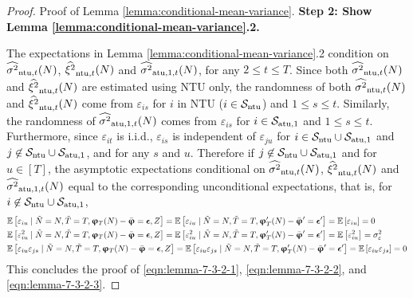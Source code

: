 \begin{proof}{Proof of Lemma \ref{lemma:conditional-mean-variance}.}
\textbf{Step 2: Show Lemma \ref{lemma:conditional-mean-variance}.2.}

The expectations in Lemma \ref{lemma:conditional-mean-variance}.2 condition on $\widehat{\sigma^2}_{\mathrm{ntu},t}(N)$, $\widehat{\xi^2}_{\mathrm{ntu},t}(N)$ and $\widehat{\sigma^2}_{\mathrm{atu},1,t}(N)$, for any $2 \leq t \leq T$. Since both $\widehat{\sigma^2}_{\mathrm{ntu},t}(N)$ and $\widehat{\xi^2}_{\mathrm{ntu},t}(N)$ are estimated using NTU only, the randomness of both $\widehat{\sigma^2}_{\mathrm{ntu},t}(N)$ and $\widehat{\xi^2}_{\mathrm{ntu},t}(N)$ come from $\varepsilon_{is}$ for $i $ in NTU ($i \in \mathcal{S}_{\mathrm{ntu}}$) and $1 \leq s\leq t$. Similarly, the randomness of $\widehat{\sigma^2}_{\mathrm{atu},1,t}(N)$ comes from $\varepsilon_{is}$ for $i \in \mathcal{S}_{\mathrm{atu},1}$ and $1 \leq s\leq t$.  Furthermore, since $\varepsilon_{it}$ is i.i.d.,  $\varepsilon_{is}$ is independent of $\varepsilon_{ju}$ for $i \in \mathcal{S}_{\mathrm{ntu}} \cup \mathcal{S}_{\mathrm{atu},1}$ and $j \not \in \mathcal{S}_{\mathrm{ntu}} \cup \mathcal{S}_{\mathrm{atu},1}$, and for any $s$ and $u$. Therefore if $j \not \in \mathcal{S}_{\mathrm{ntu}}  \cup \mathcal{S}_{\mathrm{atu},1}$ and for $u \in [T]$, the asymptotic expectations conditional on $\widehat{\sigma^2}_{\mathrm{ntu},t}(N)$, $\widehat{\xi^2}_{\mathrm{ntu},t}(N)$ and $\widehat{\sigma^2}_{\mathrm{atu},1,t}(N)$ equal to the corresponding unconditional expectations, that is, for $i \not \in \mathcal{S}_{\mathrm{ntu}} \cup \mathcal{S}_{\mathrm{atu},1}$,
\begin{align*}
&\mathbb{E}\left[\varepsilon_{iu}  \mid \tilde{N} = N, \tilde{T} = T, \bm{\upvarphi}_T(N) - \bar{\bm{\upvarphi}} = {\bm{\epsilon}}, Z \right] = \mathbb{E}\left[\varepsilon_{iu}  \mid \tilde{N} = N, \tilde{T} = T, \bm{\upvarphi}^\prime_T(N) - \bar{\bm{\upvarphi}}^\prime = {\bm{\epsilon}}^\prime \right] = \mathbb{E}\left[\varepsilon_{iu}  \right] = 0  \\
&\mathbb{E}\left[\varepsilon_{iu}^2  \mid \tilde{N} = N, \tilde{T} = T, \bm{\upvarphi}_T(N) - \bar{\bm{\upvarphi}} = {\bm{\epsilon}}, Z \right] =    \mathbb{E}\left[\varepsilon_{iu}^2  \mid \tilde{N} = N, \tilde{T} = T, \bm{\upvarphi}^\prime_T(N) - \bar{\bm{\upvarphi}}^\prime = {\bm{\epsilon}}^\prime \right] = \mathbb{E}\left[\varepsilon_{iu}^2  \right] = \sigma_\varepsilon^2 \\
& \mathbb{E}\left[\varepsilon_{iu} \varepsilon_{js}  \mid \tilde{N} = N, \tilde{T} = T, \bm{\upvarphi}_T(N) - \bar{\bm{\upvarphi}} = {\bm{\epsilon}}, Z \right] =    \mathbb{E}\left[\varepsilon_{iu} \varepsilon_{js}  \mid \tilde{N} = N, \tilde{T} = T, \bm{\upvarphi}^\prime_T(N) - \bar{\bm{\upvarphi}}^\prime = {\bm{\epsilon}}^\prime \right] = \mathbb{E}\left[\varepsilon_{iu} \varepsilon_{js}  \right] = 0 
\end{align*}
This concludes the proof of \eqref{eqn:lemma-7-3-2-1}, \eqref{eqn:lemma-7-3-2-2}, and \eqref{eqn:lemma-7-3-2-3}. \halmos

\end{proof}

